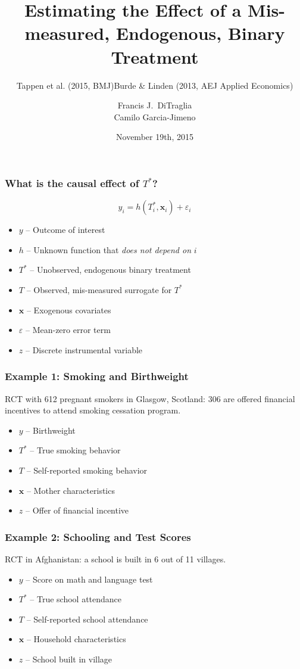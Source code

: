 \documentclass{beamer}
\title[Binary Regressors]{Estimating the Effect of a Mis-measured, Endogenous, Binary Treatment}
\author[FJ DiTraglia]{Francis J.\ DiTraglia\\ Camilo Garcia-Jimeno}
\institute{University of Pennsylvania}
\date{November 19th, 2015}
\begin{document}
 

\begin{frame}[plain]
	\titlepage 
\end{frame} 
\begin{frame}
  \frametitle{What is the causal effect of $T^*$?}
  \[ y_i = h(T^*_i, \mathbf{x}_i) + \varepsilon_i\]
  \begin{itemize}
    \item $y$ -- Outcome of interest
    \item $h$ -- Unknown function that \emph{does not depend on} $i$
    \item $T^*$ -- Unobserved, endogenous binary treatment
    \item $T$ -- Observed, mis-measured surrogate for $T^*$
    \item $\mathbf{x}$ -- Exogenous covariates
    \item $\varepsilon$ -- Mean-zero error term
    \item $z$ -- Discrete instrumental variable
  \end{itemize}
\end{frame}
\begin{frame}
  \frametitle{Example 1: Smoking and Birthweight}
\subtitle{Tappen et al. (2015, BMJ)}
  RCT with 612 pregnant smokers in Glasgow, Scotland: 306 are offered financial incentives to attend smoking cessation program.
\begin{itemize}
  \item $y$ -- Birthweight 
  \item $T^*$ -- True smoking behavior 
  \item $T$ -- Self-reported smoking behavior
  \item $\mathbf{x}$ -- Mother characteristics
  \item $z$ -- Offer of financial incentive
\end{itemize}
   
\end{frame}
\begin{frame}
  \frametitle{Example 2: Schooling and Test Scores}
\subtitle{Burde \& Linden (2013, AEJ Applied Economics)}
  RCT in Afghanistan: a school is built in 6 out of 11 villages.
\begin{itemize}
  \item $y$ -- Score on math and language test 
  \item $T^*$ -- True school attendance
  \item $T$ -- Self-reported school attendance
  \item $\mathbf{x}$ -- Household characteristics
  \item $z$ -- School built in village
\end{itemize}
   
\end{frame}
\end{document}
